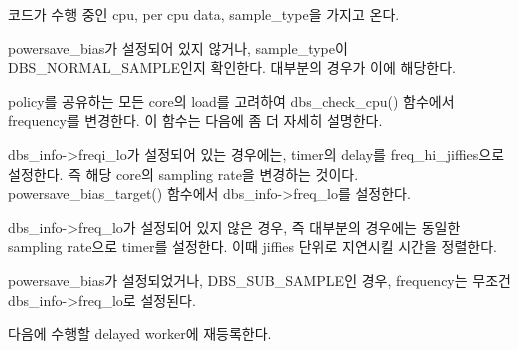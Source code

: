 \begin{compactenum}
\item 코드가 수행 중인 cpu, per cpu data, sample\_type을 가지고 온다. 
\item powersave\_bias가 설정되어 있지 않거나, sample\_type이 DBS\_NORMAL\_SAMPLE인지 확인한다. 
대부분의 경우가 이에 해당한다. 
\item policy를 공유하는 모든 core의 load를 고려하여 dbs\_check\_cpu() 함수에서 frequency를 변경한다. 
이 함수는 다음에 좀 더 자세히 설명한다. 
\item dbs\_info->freqi\_lo가 설정되어 있는 경우에는, timer의 delay를 freq\_hi\_jiffies으로 설정한다. 
즉 해당 core의 sampling rate을 변경하는 것이다. powersave\_bias\_target() 함수에서 dbs\_info->freq\_lo를 설정한다.
\item dbs\_info->freq\_lo가 설정되어 있지 않은 경우, 즉 대부분의 경우에는 동일한 sampling rate으로 timer를 설정한다. 
이때 jiffies 단위로 지연시킬 시간을 정렬한다. 
\item powersave\_bias가 설정되었거나, DBS\_SUB\_SAMPLE인 경우, frequency는 무조건 dbs\_info->freq\_lo로 설정된다.
\item 다음에 수행할 delayed worker에 재등록한다. 
\end{compactenum}

